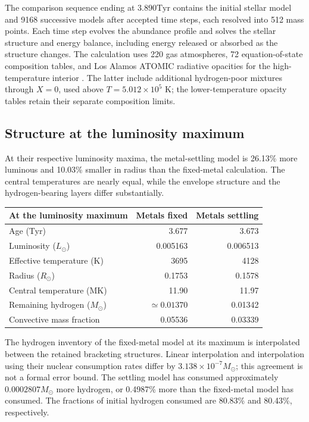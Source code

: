 \documentclass[11pt,letterpaper]{article}
\newcommand{\Ms}{M_\odot}\newcommand{\Rs}{R_\odot}\newcommand{\Ls}{L_\odot}
\newcommand{\Tyr}{\mathrm{Tyr}}
\begin{document}
The comparison sequence ending at $3.890\Tyr$ contains the initial stellar model and 9168 successive
models after accepted time steps, each resolved into 512 mass points. Each time
step evolves the abundance profile and solves the stellar structure and energy
balance, including energy released or absorbed as the structure changes.
The calculation uses 220 gas atmospheres, 72 equation-of-state composition
tables, and Los Alamos ATOMIC radiative opacities for the
high-temperature interior \cite{colgan16,tops}. The latter include additional
hydrogen-poor mixtures through $X=0$, used above $T=5.012\times10^5$ K;
the lower-temperature opacity tables retain their separate composition limits.


\subsection{Structure at the luminosity maximum}
At their respective luminosity maxima, the metal-settling model is 26.13\%
more luminous and 10.03\% smaller in radius than the fixed-metal calculation.
The central temperatures are nearly equal, while the envelope structure and
the hydrogen-bearing layers differ substantially.

\begin{center}\begin{tabular}{@{}lrr@{}}\toprule
At the luminosity maximum & Metals fixed & Metals settling \\\midrule
Age (Tyr) & 3.677 & 3.673 \\
Luminosity ($\Ls$) & 0.005163 & 0.006513 \\
Effective temperature (K) & 3695 & 4128 \\
Radius ($\Rs$) & 0.1753 & 0.1578 \\
Central temperature (MK) & 11.90 & 11.97 \\
Remaining hydrogen ($\Ms$) & $\simeq0.01370$ & 0.01342 \\
Convective mass fraction & 0.05536 & 0.03339 \\\bottomrule
\end{tabular}\end{center}

The hydrogen inventory of the fixed-metal model at its maximum is
interpolated between the retained bracketing structures. Linear interpolation
and interpolation using their nuclear consumption rates differ by
$3.138\times10^{-7}\Ms$; this agreement is not a formal error bound.
The settling model has consumed approximately $0.0002807\Ms$ more hydrogen,
or 0.4987\% more than the fixed-metal model has consumed. The fractions
of initial hydrogen consumed are 80.83\% and 80.43\%, respectively.
\end{document}
